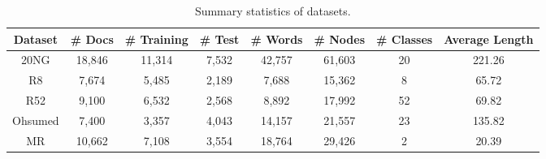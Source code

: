 \documentclass[letterpaper]{article} \usepackage{aaai19}  \usepackage{times}  \usepackage{helvet}  \usepackage{courier}  \usepackage{url}  \usepackage{graphicx}  \frenchspacing  \usepackage{amsmath}
\begin{document}
    {\small
    \begin{table*}[t]\footnotesize
    \centering
    \renewcommand{\arraystretch}{1.2}
    \caption{Summary statistics of datasets.}
    \begin{tabular}{c|ccccccc}
    \hline
    \bf{Dataset}& \bf{\# Docs}	& \bf{\# Training}& \bf{\# Test}& \bf{\# Words} & \bf{\# Nodes}& \bf{\# Classes} & \bf{Average Length} \\
    \hline
    20NG & 18,846 & 11,314 & 7,532 & 42,757 & 61,603 & 20  & 221.26\\
   
     R8 & 7,674 &5,485 & 2,189 & 7,688 & 15,362 & 8 & 65.72\\
    
     R52& 9,100 & 6,532	 & 2,568 & 8,892& 17,992 & 52 & 69.82\\
    
    Ohsumed& 7,400 & 3,357 & 4,043 & 14,157 & 21,557 & 23 & 135.82\\
    MR& 10,662 & 7,108 & 3,554 & 18,764 & 29,426 & 2 &20.39\\
    \hline
    \end{tabular}
    \label{tab:statistics}
    \end{table*}
    }
    
\end{document}
